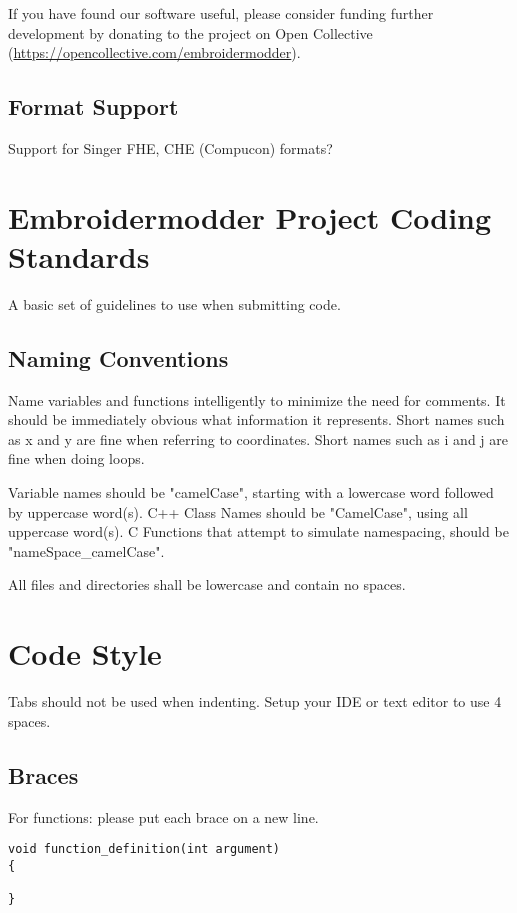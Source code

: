 If you have found our software useful, please consider funding further development by donating to the project on Open Collective (\url{https://opencollective.com/embroidermodder}).

\subsection{Format Support}

Support for Singer FHE, CHE (Compucon) formats?

\section{Embroidermodder Project Coding Standards}

A basic set of guidelines to use when submitting code.

\subsection{Naming Conventions}

Name variables and functions intelligently to minimize the need for
comments. It should be immediately obvious what information it
represents. Short names such as x and y are fine when referring to
coordinates. Short names such as i and j are fine when doing loops.

Variable names should be "camelCase", starting with a lowercase word
followed by uppercase word(s). C++ Class Names should be "CamelCase",
using all uppercase word(s). C Functions that attempt to simulate namespacing, should be "nameSpace\_camelCase".

All files and directories shall be lowercase and contain no spaces.

\section{Code Style}

Tabs should not be used when indenting. Setup your IDE or text editor to
use 4 spaces.

\subsection{Braces}

For functions: please put each brace on a new line.

\begin{verbatim}
void function_definition(int argument)
{

}
\end{verbatim}

